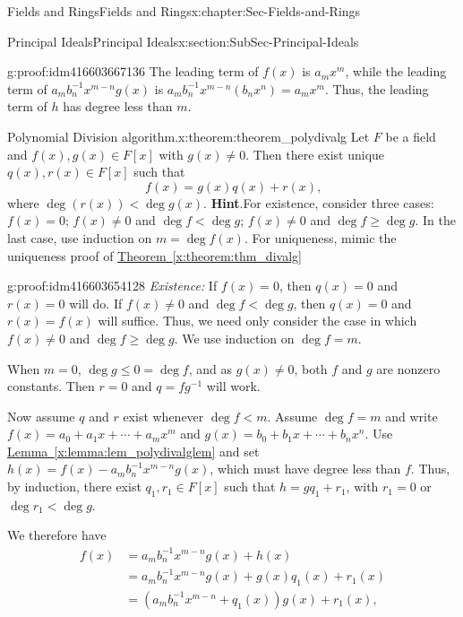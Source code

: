 \documentclass[oneside,10pt,]{book}
\numberwithin{equation}{section}
\renewcommand{\le}{\leqslant}
\renewcommand{\ge}{\geqslant}
\newcommand{\lt}{<}
\newcommand{\amp}{&}
\begin{document}
\begin{chapterptx}{Fields and Rings}{}{Fields and Rings}{}{}{x:chapter:Sec-Fields-and-Rings}
\begin{sectionptx}{Principal Ideals}{}{Principal Ideals}{}{}{x:section:SubSec-Principal-Ideals}
\begin{proofptx}{}{g:proof:idm416603667136}
The leading term of \(f(x)\) is \(a_m x^m\), while the leading term of \(a_m b_n^{-1} x^{m-n} g(x)\) is \(a_m b_n^{-1} x^{m-n} (b_n x^n) = a_m x^m\). Thus, the leading term of \(h\) has degree less than \(m\).%
\end{proofptx}
\begin{theorem}{Polynomial Division algorithm.}{}{x:theorem:theorem_polydivalg}%
Let \(F\) be a field and \(f(x),g(x)\in F[x]\) with \(g(x)\ne 0\). Then there exist unique \(q(x),
r(x) \in F[x]\) such that%
\begin{equation*}
f(x) = g(x) q(x) + r(x)\text{,}
\end{equation*}
where \(\deg(r(x)) \lt  \deg g(x)\).%
\textbf{Hint}.\quad{}For existence, consider three cases: \(f(x) = 0\); \(f(x) \ne 0\) and \(\deg f \lt \deg g\); \(f(x) \ne 0\) and \(\deg f \ge \deg g\). In the last case, use induction on \(m = \deg f(x)\). For uniqueness, mimic the uniqueness proof of \hyperref[x:theorem:thm_divalg]{Theorem~\ref{x:theorem:thm_divalg}}%
\end{theorem}
\begin{proofptx}{}{g:proof:idm416603654128}
\emph{Existence:} If \(f(x) = 0\), then \(q(x) = 0\) and \(r(x) = 0\) will do. If \(f(x)\ne 0\) and \(\deg f \lt \deg g\), then \(q(x) = 0\) and \(r(x) = f(x)\) will suffice. Thus, we need only consider the case in which \(f(x) \ne 0\) and \(\deg f \ge \deg g\). We use induction on \(\deg f = m\).%
\par
When \(m = 0\), \(\deg g \le 0 = \deg f\), and as \(g(x) \ne 0\), both \(f\) and \(g\) are nonzero constants. Then \(r = 0\) and \(q = fg^{-1}\) will work.%
\par
Now assume \(q\) and \(r\) exist whenever \(\deg f \lt m\). Assume \(\deg f = m\) and write \(f(x) = a_0 + a_1 x + \cdots + a_m x^m\) and \(g(x) = b_0 + b_1 x + \cdots + b_n x^n\). Use \hyperref[x:lemma:lem_polydivalglem]{Lemma~\ref{x:lemma:lem_polydivalglem}} and set \(h(x) = f(x) - a_m b_n^{-1} x^{m-n} g(x)\), which must have degree less than \(f\). Thus, by induction, there exist \(q_1, r_1\in F[x]\) such that \(h = g q_1 + r_1\), with \(r_1 = 0\) or \(\deg r_1 \lt \deg g\).%
\par
We therefore have%
\begin{align*}
f(x) \amp = a_m b_n^{-1} x^{m-n} g(x) + h(x)\\
\amp = a_m b_n^{-1} x^{m-n} g(x) + g(x) q_1(x) + r_1(x)\\
\amp = (a_m b_n^{-1} x^{m-n} + q_1(x)) g(x) + r_1(x)\text{,}
\end{align*}

\end{proofptx}
\end{sectionptx}
\end{chapterptx}
\end{document}
